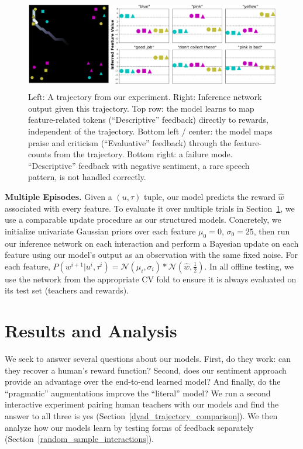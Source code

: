 \documentclass[letterpaper]{article} %
\begin{document}
\begin{figure}[h]
\begin{center}
\includegraphics[width=12.6cm,height=1.58in ]{images/neural_net_learning_final.png}
\end{center}
\caption{Left: A trajectory from our experiment. Right: Inference network output given this trajectory. Top row: the model learns to map feature-related tokens (``Descriptive'' feedback) directly to rewards, independent of the trajectory. Bottom left / center: the model maps praise and criticism (``Evaluative'' feedback) through the feature-counts from the trajectory. Bottom right: a failure mode. ``Descriptive'' feedback with negative sentiment, a rare speech pattern, is not handled correctly.}
\label{learned_utterance_targets}
\end{figure}

\textbf{Multiple Episodes.} Given a $(u, \tau)$ tuple, our model predicts the reward $\hat{w}$ associated with every feature. To evaluate it over multiple trials in Section~\ref{results_and_analysis_section}, we use a comparable update procedure as our structured models. Concretely, we initialize univariate Gaussian priors over each feature $\mu_0 = 0$, $\sigma_0 = 25$, then run our inference network on each interaction and perform a Bayesian update on each feature using our model's output as an observation with the same fixed noise. For each feature, $P(w^{i+1} | u^i, \tau^i) = \mathcal{N}(\mu_{i},\sigma_{i}) * \mathcal{N}(\hat{w}, \frac{1}{2})$. In all offline testing, we use the network from the appropriate CV fold to ensure it is always evaluated on its test set (teachers and rewards).

\section{Results and Analysis}
\label{results_and_analysis_section}
We seek to answer several questions about our models. First, do they work: can they recover a human's reward function? Second, does our sentiment approach provide an advantage over the end-to-end learned model? And finally, do the ``pragmatic'' augmentations improve the ``literal'' model? We run a second interactive experiment pairing human teachers with our models and find the answer to all three is yes (Section~\ref{dyad_trajectory_comparison}). We then analyze how our models learn by testing forms of feedback separately (Section~\ref{random_sample_interactions}).
\end{document}
